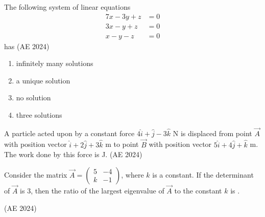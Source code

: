 \item The following system of linear equations
\begin{align*}
7x - 3y + z &= 0 \\
3x - y + z &= 0 \\
x - y - z &= 0
\end{align*}
has
\hfill (AE 2024)
\begin{enumerate}
    \item infinitely many solutions
    \item a unique solution
    \item no solution
    \item three solutions
\end{enumerate}
\item A particle acted upon by a constant force $4\hat{i} + \hat{j} - 3\hat{k}$ N is displaced from point $\vec{A}$ with position vector $\hat{i} + 2\hat{j} + 3\hat{k}$ m to point $\vec{B}$ with position vector $5\hat{i} + 4\hat{j} + \hat{k}$ m. The work done by this force is \underline{\hspace{1cm}} J.
\hfill (AE 2024)
\item Consider the matrix $\vec{A} = \begin{pmatrix} 5 & -4 \\ k & -1 \end{pmatrix}$, where $k$ is a constant. If the determinant of $\vec{A}$ is 3, then the ratio of the largest eigenvalue of $\vec{A}$ to the constant $k$ is \underline{\hspace{1cm}}.  

\hfill (AE 2024)
